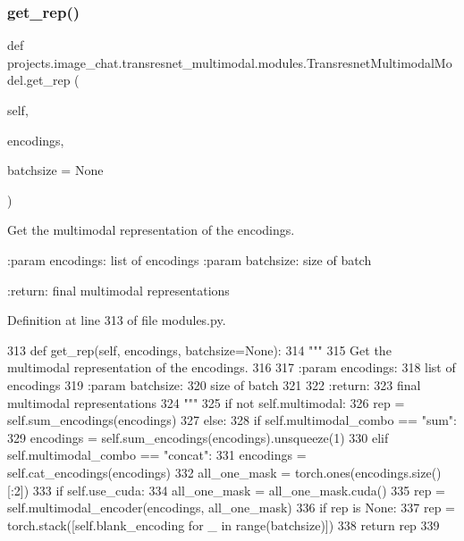 \subsubsection{\texorpdfstring{get\+\_\+rep()}{get\_rep()}}
{\footnotesize\ttfamily def projects.\+image\+\_\+chat.\+transresnet\+\_\+multimodal.\+modules.\+Transresnet\+Multimodal\+Model.\+get\+\_\+rep (\begin{DoxyParamCaption}\item[{}]{self,  }\item[{}]{encodings,  }\item[{}]{batchsize = {\ttfamily None} }\end{DoxyParamCaption})}

\begin{DoxyVerb}Get the multimodal representation of the encodings.

:param encodings:
    list of encodings
:param batchsize:
    size of batch

:return:
    final multimodal representations
\end{DoxyVerb}
 

Definition at line 313 of file modules.\+py.


\begin{DoxyCode}
313     \textcolor{keyword}{def }get\_rep(self, encodings, batchsize=None):
314         \textcolor{stringliteral}{"""}
315 \textcolor{stringliteral}{        Get the multimodal representation of the encodings.}
316 \textcolor{stringliteral}{}
317 \textcolor{stringliteral}{        :param encodings:}
318 \textcolor{stringliteral}{            list of encodings}
319 \textcolor{stringliteral}{        :param batchsize:}
320 \textcolor{stringliteral}{            size of batch}
321 \textcolor{stringliteral}{}
322 \textcolor{stringliteral}{        :return:}
323 \textcolor{stringliteral}{            final multimodal representations}
324 \textcolor{stringliteral}{        """}
325         \textcolor{keywordflow}{if} \textcolor{keywordflow}{not} self.multimodal:
326             rep = self.sum\_encodings(encodings)
327         \textcolor{keywordflow}{else}:
328             \textcolor{keywordflow}{if} self.multimodal\_combo == \textcolor{stringliteral}{"sum"}:
329                 encodings = self.sum\_encodings(encodings).unsqueeze(1)
330             \textcolor{keywordflow}{elif} self.multimodal\_combo == \textcolor{stringliteral}{"concat"}:
331                 encodings = self.cat\_encodings(encodings)
332             all\_one\_mask = torch.ones(encodings.size()[:2])
333             \textcolor{keywordflow}{if} self.use\_cuda:
334                 all\_one\_mask = all\_one\_mask.cuda()
335             rep = self.multimodal\_encoder(encodings, all\_one\_mask)
336         \textcolor{keywordflow}{if} rep \textcolor{keywordflow}{is} \textcolor{keywordtype}{None}:
337             rep = torch.stack([self.blank\_encoding \textcolor{keywordflow}{for} \_ \textcolor{keywordflow}{in} range(batchsize)])
338         \textcolor{keywordflow}{return} rep
339 
\end{DoxyCode}


